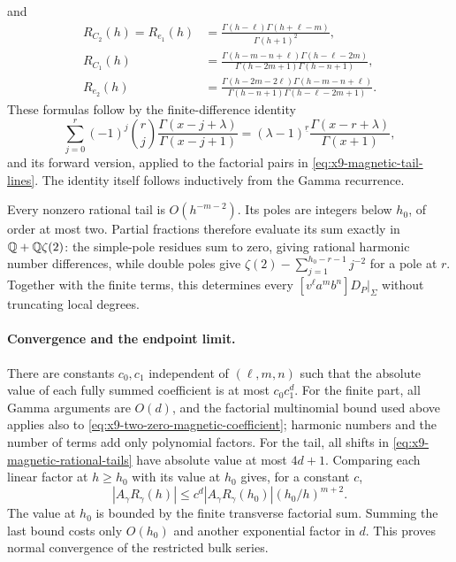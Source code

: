 and
\begin{equation}
 \begin{aligned}
 R_{C_2}(h)=R_{e_1}(h)
  &=\frac{\Gamma(h-\ell)\Gamma(h+\ell-m)}{\Gamma(h+1)^2},\\
 R_{C_1}(h)
  &=\frac{\Gamma(h-m-n+\ell)\Gamma(h-\ell-2m)}
          {\Gamma(h-2m+1)\Gamma(h-n+1)},\\
 R_{e_2}(h)
  &=\frac{\Gamma(h-2m-2\ell)\Gamma(h-m-n+\ell)}
          {\Gamma(h-n+1)\Gamma(h-\ell-2m+1)}.
 \end{aligned}
 \label{eq:x9-magnetic-rational-tails}
\end{equation}
These formulas follow by the finite-difference identity
\begin{equation}
 \sum_{j=0}^r(-1)^j\binom rj
       \frac{\Gamma(x-j+\lambda)}{\Gamma(x-j+1)}
 = (\lambda-1)^{\underline r}
       \frac{\Gamma(x-r+\lambda)}{\Gamma(x+1)},
 \label{eq:x9-magnetic-finite-difference}
\end{equation}
and its forward version, applied to the factorial pairs in
\eqref{eq:x9-magnetic-tail-lines}. The identity itself follows
inductively from the Gamma recurrence.

Every nonzero rational tail is $O(h^{-m-2})$. Its poles are
integers below $h_0$, of order at most two. Partial fractions
therefore evaluate its sum exactly in $\mathbb Q+\mathbb Q\zeta(2)$:
the simple-pole residues sum to zero, giving rational harmonic
number differences, while double poles give
$\zeta(2)-\sum_{j=1}^{h_0-r-1}j^{-2}$ for a pole at $r$.
Together with the finite terms, this determines every
$[v^\ell a^m b^n]D_P|_\Sigma$ without truncating local degrees.

\paragraph{Convergence and the endpoint limit.}
There are constants $c_0,c_1$ independent of $(\ell,m,n)$ such
that the absolute value of each fully summed coefficient is at
most $c_0c_1^d$. For the finite part, all Gamma arguments are
$O(d)$, and the factorial multinomial bound used above applies
also to \eqref{eq:x9-two-zero-magnetic-coefficient}; harmonic
numbers and the number of terms add only polynomial factors.
For the tail, all shifts in \eqref{eq:x9-magnetic-rational-tails}
have absolute value at most $4d+1$. Comparing each linear factor
at $h\geq h_0$ with its value at $h_0$ gives, for a constant $c$,
\begin{equation}
 |A_\gamma R_\gamma(h)|
 \leq c^d|A_\gamma R_\gamma(h_0)|
                  (h_0/h)^{m+2}.
 \label{eq:x9-magnetic-tail-bound}
\end{equation}
The value at $h_0$ is bounded by the finite transverse factorial
sum. Summing the last bound costs only $O(h_0)$ and another
exponential factor in $d$. This proves normal convergence of
the restricted bulk series.

